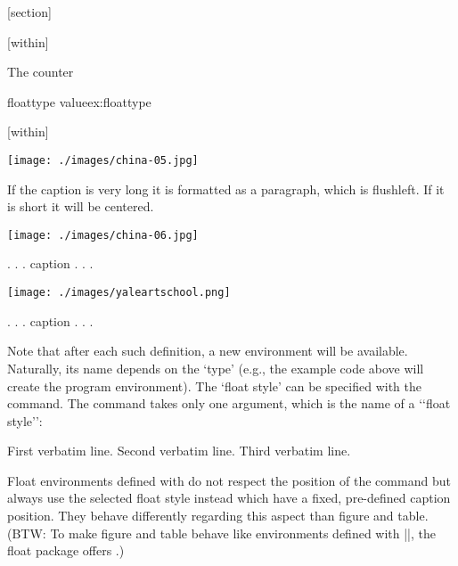 \begin{teX}
[section]
\end{teX}





[within]

The counter 

\begin{texexample}{floattype value}{ex:floattype}
\makeatletter
\value{float@type}

[within]
\value{float@type}
\makeatother
\end{texexample}

\begin{Photo}
 \centering
 \texttt{[image: ./images/china-05.jpg]}
\caption[a short caption]{If the caption is very long it is formatted as a paragraph, which is flushleft. If it is short it will be centered. }
\end{Photo}


\begin{Photo}
 \centering
 \texttt{[image: ./images/china-06.jpg]}
\caption{. . . caption . . . }
\end{Photo}

\begin{Photo}
 \centering
 \texttt{[image: ./images/yaleartschool.png]}
\caption{. . . caption . . . }
\end{Photo}



Note that after each such definition, a new 
environment will be available. Naturally,
its name depends on the `type' (e.g., the example code above will create the program
environment). The `float style' can be specified with the  command. The
command takes only one argument, which is the name of a ‘‘float style’’:

\begin{teX}
\begin{Example}
     First verbatim line.
     Second verbatim line.
     Third verbatim line.
\end{Example}
\end{teX}

Float environments defined with  do not respect the position of the 
 command but always use the selected float style instead which have a fixed, pre-defined caption position. They behave differently regarding this aspect than figure and table. (BTW: To make figure and table behave like environments defined with |\newfloat|, the float package offers .)

